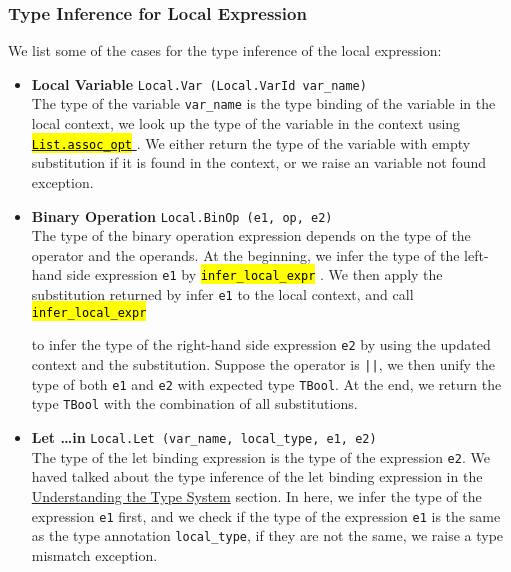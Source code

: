 \documentclass{article}
\newcommand{\highlighttexttt}[2][black]{ %
  \sethlcolor{cyan!10} %
  \texttt{\textcolor{#1}{\hl{#2}}}
}
\begin{document}
    \subsubsection{Type Inference for Local Expression}\label{local_expr}
        We list some of the cases for the type inference of the local expression:
        \begin{itemize}
            \item \textbf{Local Variable} \texttt{Local.Var (Local.VarId var\_name)}\\
                  The type of the variable \texttt{var\_name} is the type binding of the variable in the local context, we look up the type of the variable in the context
                  using \href{https://ocaml.org/manual/5.2/api/List.html#VALassoc_opt}{\highlighttexttt[orange]{List.assoc\_opt}}. We either
                  return the type of the variable with empty substitution if it is found in the context, or we raise an variable not found exception.
            \item \textbf{Binary Operation} \texttt{Local.BinOp (e1, op, e2)}\\
                  The type of the binary operation expression depends on the type of the operator and the operands.
                  At the beginning, we infer the type of the left-hand side expression \texttt{e1} by \highlighttexttt{infer\_local\_expr}.
                  We then apply the substitution returned by infer \texttt{e1} to the local context, and call \highlighttexttt{infer\_local\_expr}
                  to infer the type of the right-hand side expression \texttt{e2} by using the updated context and the substitution.
                  Suppose the operator is \texttt{||}, we then unify the type of both \texttt{e1} and \texttt{e2} with expected type \texttt{TBool}.
                  At the end, we return the type \texttt{TBool} with the combination of all substitutions.
            \item \textbf{Let \ldots in} \texttt{Local.Let (var\_name, local\_type, e1, e2)}\\
                  The type of the let binding expression is the type of the expression \texttt{e2}. We haved talked about the type inference of the
                  let binding expression in the \hyperref[understand_type_system]{Understanding the Type System} section. In here,
                  we infer the type of the expression \texttt{e1} first, and we check if the type of the expression \texttt{e1}
                  is the same as the type annotation \texttt{local\_type}, if they are not the same, we raise a type mismatch exception.

\end{itemize}
\end{document}
